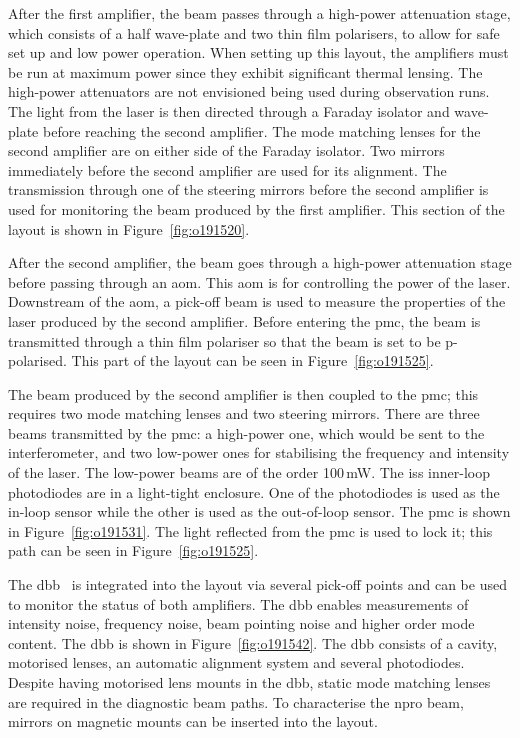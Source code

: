 After the first amplifier, the beam passes through a high-power attenuation stage, which consists of a half wave-plate and two thin film polarisers, to allow for safe set up and low power operation. When setting up this layout, the amplifiers must be run at maximum power since they exhibit significant thermal lensing. The high-power attenuators are not envisioned being used during observation runs. The light from the laser is then directed through a Faraday isolator and wave-plate before reaching the second amplifier. The mode matching lenses for the second amplifier are on either side of the Faraday isolator. Two mirrors immediately before the second amplifier are used for its alignment. The transmission through one of the steering mirrors before the second amplifier is used for monitoring the beam produced by the first amplifier. This section of the layout is shown in Figure~\ref{fig:o191520}.
\par
After the second amplifier, the beam goes through a high-power attenuation stage before passing through an \gls{aom}. This \gls{aom} is for controlling the power of the laser. Downstream of the \gls{aom}, a pick-off beam is used to measure the properties of the laser produced by the second amplifier. Before entering the \gls{pmc}, the beam is transmitted through a thin film polariser so that the beam is set to be p-polarised. This part of the layout can be seen in Figure~\ref{fig:o191525}.
\par
The beam produced by the second amplifier is then coupled to the \gls{pmc}; this requires two mode matching lenses and two steering mirrors. There are three beams transmitted by the \gls{pmc}: a high-power one, which would be sent to the interferometer, and two low-power ones for stabilising the frequency and intensity of the laser. The low-power beams are of the order 100\,\si{\milli\watt}. The \gls{iss} inner-loop photodiodes are in a light-tight enclosure. One of the photodiodes is used as the in-loop sensor while the other is used as the out-of-loop sensor. The \gls{pmc}  is shown in Figure~\ref{fig:o191531}. The light reflected from the \gls{pmc} is used to lock it; this path can be seen in Figure~\ref{fig:o191525}.
\par
The \gls{dbb}~\cite{Kwee2007,kwee_thesis} is integrated into the layout via several pick-off points and can be used to monitor the status of both amplifiers. The \gls{dbb} enables measurements of intensity noise, frequency noise, beam pointing noise and higher order mode content. The \gls{dbb} is shown in Figure~\ref{fig:o191542}. The \gls{dbb} consists of a cavity, motorised lenses, an automatic alignment system and several photodiodes. Despite having motorised lens mounts in the \gls{dbb}, static mode matching lenses are required in the diagnostic beam paths. To characterise the \gls{npro} beam, mirrors on magnetic mounts can be inserted into the layout.
